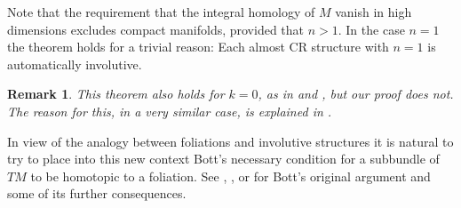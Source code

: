 \documentclass{amsart}
\newtheorem{remark}{Remark}
\begin{document}
Note that the requirement that the integral homology of $M$ vanish in
high dimensions excludes compact manifolds, provided that $n>1$.  In
the case $n=1$ the theorem holds for a trivial reason:  Each almost CR
structure with $n=1$ is automatically involutive.  

\begin{remark}
This theorem also holds for $k=0$, as in \cite{Ad} and
\cite{Land}, but our proof does not.  The reason for this, in a very
similar case, is explained in \cite{JL}.  
\end{remark}

In view of the analogy between foliations and involutive structures it is
natural to try to place into this new context Bott's necessary
condition for a subbundle of $TM$ to be homotopic to a foliation.  See
\cite{Bott68}, \cite{BottICM}, or \cite{BottLectures} for Bott's original argument 
and some of its further consequences.  
\end{document}
